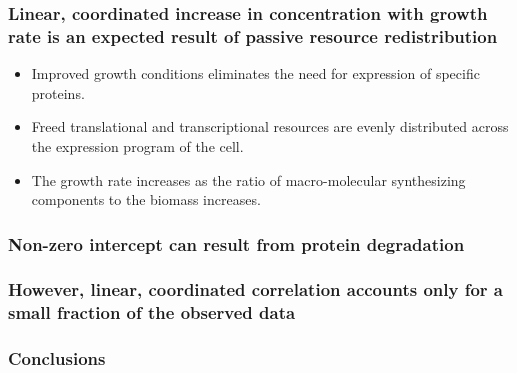 \documentclass[mathserif]{beamer}
\begin{document}
\begin{frame}
\frametitle{Linear, coordinated increase in concentration with growth rate is an expected result of passive resource redistribution}
\begin{itemize}
\item Improved growth conditions eliminates the need for expression of specific proteins.
\item Freed translational and transcriptional resources are evenly distributed across the expression program of the cell.
\item The growth rate increases as the ratio of macro-molecular synthesizing components to the biomass increases.
\end{itemize}
\end{frame}

\begin{frame}
\frametitle{Non-zero intercept can result from protein degradation}
\end{frame}

\begin{frame}
\frametitle{However, linear, coordinated correlation accounts only for a small fraction of the observed data}
\end{frame}
\begin{frame}
\frametitle{Conclusions}
\end{frame}
\end{document}
